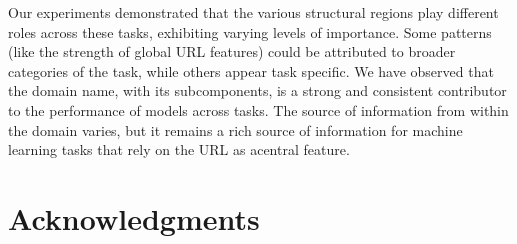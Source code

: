 \documentclass[sigconf]{acmart}
\begin{document}
Our experiments demonstrated that the various structural regions play different roles across 
these tasks, exhibiting varying levels of importance. Some patterns (like the strength of global URL features)
could be attributed to broader categories of the task, while others appear task specific.
We have observed that the domain name, with its subcomponents, is a strong and consistent contributor to the
performance of models across tasks. The source of information from within the domain varies, but it remains
a rich source of information for machine learning tasks that rely on the URL as acentral feature.


\section{Acknowledgments}



\end{document}
